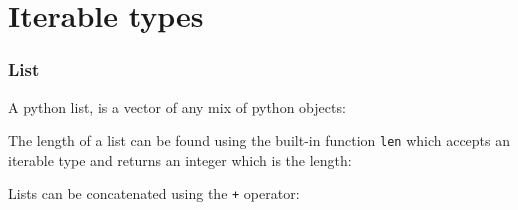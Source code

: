 \section{Iterable types}\label{python-introduction.md__iterable-types}

\subsubsection{List}\label{python-introduction.md__list}

A python list, is a vector of any mix of python objects:

\begin{Shaded}
\begin{Highlighting}[]
\NormalTok{([}\NormalTok{,}\NormalTok{,}\NormalTok{,}\NormalTok{,}\NormalTok{,[]])}
\end{Highlighting}
\end{Shaded}

\begin{Shaded}
\begin{Highlighting}[]
\end{Highlighting}
\end{Shaded}

The length of a list can be found using the built-in function
\texttt{len} which accepts an iterable type and returns an integer which
is the length:

\begin{Shaded}
\begin{Highlighting}[]
\end{Highlighting}
\end{Shaded}

\begin{Shaded}
\begin{Highlighting}[]
\end{Highlighting}
\end{Shaded}

Lists can be concatenated using the \texttt{+} operator:

\begin{Shaded}
\begin{Highlighting}[]
\NormalTok{[}\NormalTok{,}\NormalTok{,}\NormalTok{]}\OperatorTok{+}\NormalTok{[}\NormalTok{,}\NormalTok{]}
\end{Highlighting}
\end{Shaded}


